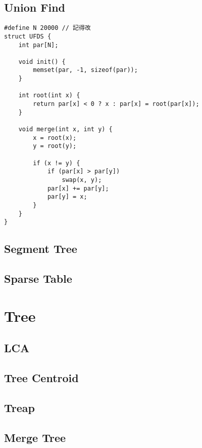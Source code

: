 \documentclass[10pt,oneside]{article}
\begin{document}
\begin{landscape}
\begin{multicols}{2}
\subsection{Union Find}

\begin{lstlisting}
#define N 20000 // 記得改
struct UFDS {
    int par[N];

    void init() {
        memset(par, -1, sizeof(par));
    }

    int root(int x) {
        return par[x] < 0 ? x : par[x] = root(par[x]);
    }

    void merge(int x, int y) {
        x = root(x);
        y = root(y);

        if (x != y) {
            if (par[x] > par[y])
                swap(x, y);
            par[x] += par[y];
            par[y] = x;
        }
    }
}
\end{lstlisting}

\subsection{Segment Tree}


\subsection{Sparse Table}



\section{Tree}

\subsection{LCA}

\subsection{Tree Centroid}

\subsection{Treap}

\subsection{Merge Tree}


\end{multicols}
\end{landscape}
\end{document}
